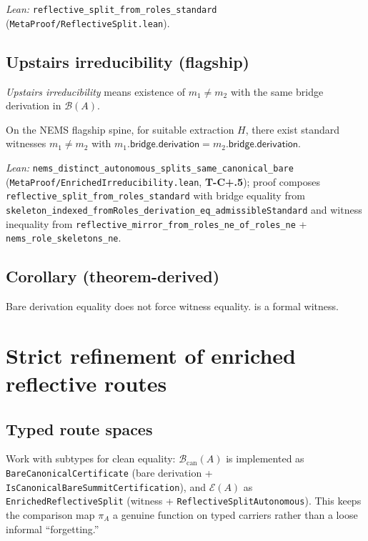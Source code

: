 \documentclass[11pt]{article}
\begin{document}
\noindent\emph{Lean:} \texttt{reflective\_split\_from\_roles\_standard} (\texttt{MetaProof/ReflectiveSplit.lean}).

\subsection{Upstairs irreducibility (flagship)}\label{sec:enriched-realization-irreducibility}
\emph{Upstairs irreducibility} means existence of $m_1 \neq m_2$ with the same bridge derivation in $\mathcal{B}(A)$.

\begin{theorem}\label{thm:enriched-irred}
On the NEMS flagship spine, for suitable extraction $H$, there exist standard witnesses $m_1 \neq m_2$ with
$m_1.\mathsf{bridge}.\mathsf{derivation} = m_2.\mathsf{bridge}.\mathsf{derivation}$.
\end{theorem}

\noindent\emph{Lean:} \texttt{nems\_distinct\_autonomous\_splits\_same\_canonical\_bare} (\texttt{MetaProof/EnrichedIrreducibility.lean}, \textbf{T-C+.5}); proof composes \texttt{reflective\_split\_from\_roles\_standard} with bridge equality from \texttt{skeleton\_indexed\_fromRoles\_derivation\_eq\_admissibleStandard} and witness inequality from \texttt{reflective\_mirror\_from\_roles\_ne\_of\_roles\_ne} + \texttt{nems\_role\_skeletons\_ne}.

\subsection{Corollary (theorem-derived)}\label{sec:enriched-realization-interpretation}
\begin{corollary}\label{cor:cert-not-unique}
Bare derivation equality does not force witness equality.  is a formal witness.
\end{corollary}

\section{Strict refinement of enriched reflective routes}\label{sec:strict-refinement}

\subsection{Typed route spaces}\label{sec:strict-refinement-routes}
Work with subtypes for clean equality: $\mathcal{B}_{\mathrm{can}}(A)$ is implemented as \texttt{BareCanonicalCertificate} (bare derivation + \texttt{IsCanonicalBareSummitCertification}), and $\mathcal{E}(A)$ as \texttt{EnrichedReflectiveSplit} (witness + \texttt{ReflectiveSplitAutonomous}). This keeps the comparison map $\pi_A$ a genuine function on typed carriers rather than a loose informal ``forgetting.''
\end{document}

